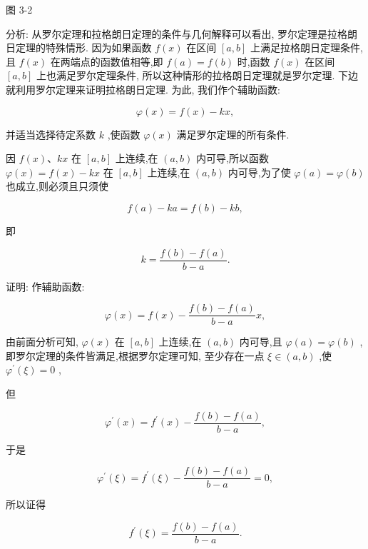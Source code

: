 \documentclass[lang=cn,newtx,12pt,scheme=chinese]{elegantbook}
\begin{document}
图 3-2

分析: 从罗尔定理和拉格朗日定理的条件与几何解释可以看出, 罗尔定理是拉格朗日定理的特殊情形. 因为如果函数 \(f\left( x\right)\) 在区间 \(\left\lbrack {a,b}\right\rbrack\) 上满足拉格朗日定理条件,且 \(f\left( x\right)\) 在两端点的函数值相等,即 \(f\left( a\right) = f\left( b\right)\) 时,函数 \(f\left( x\right)\) 在区间 \(\left\lbrack {a,b}\right\rbrack\) 上也满足罗尔定理条件, 所以这种情形的拉格朗日定理就是罗尔定理. 下边就利用罗尔定理来证明拉格朗日定理. 为此, 我们作个辅助函数:

\[
\varphi \left( x\right) = f\left( x\right) - {kx},
\]

并适当选择待定系数 \(k\) ,使函数 \(\varphi \left( x\right)\) 满足罗尔定理的所有条件.

因 \(f\left( x\right) \text{、}{kx}\) 在 \(\left\lbrack {a,b}\right\rbrack\) 上连续,在 \(\left( {a,b}\right)\) 内可导,所以函数 \(\varphi \left( x\right) = f\left( x\right) - {kx}\) 在 \(\left\lbrack {a,b}\right\rbrack\) 上连续,在 \(\left( {a,b}\right)\) 内可导,为了使 \(\varphi \left( a\right) = \varphi \left( b\right)\) 也成立,则必须且只须使

\[
f\left( a\right) - {ka} = f\left( b\right) - {kb},
\]

即

\[
k = \frac{f\left( b\right) - f\left( a\right) }{b - a}.
\]

证明: 作辅助函数:

\[
\varphi \left( x\right) = f\left( x\right) - \frac{f\left( b\right) - f\left( a\right) }{b - a}x,
\]

由前面分析可知, \(\varphi \left( x\right)\) 在 \(\left\lbrack {a,b}\right\rbrack\) 上连续,在 \(\left( {a,b}\right)\) 内可导,且 \(\varphi \left( a\right) = \varphi \left( b\right)\) ,即罗尔定理的条件皆满足,根据罗尔定理可知, 至少存在一点 \(\xi \in \left( {a,b}\right)\) ,使 \({\varphi }^{\prime }\left( \xi \right) = 0\) ,

但

\[
{\varphi }^{\prime }\left( x\right) = {f}^{\prime }\left( x\right) - \frac{f\left( b\right) - f\left( a\right) }{b - a},
\]

于是

\[
{\varphi }^{\prime }\left( \xi \right) = {f}^{\prime }\left( \xi \right) - \frac{f\left( b\right) - f\left( a\right) }{b - a} = 0,
\]

所以证得

\[
{f}^{\prime }\left( \xi \right) = \frac{f\left( b\right) - f\left( a\right) }{b - a}.
\]
\end{document}
